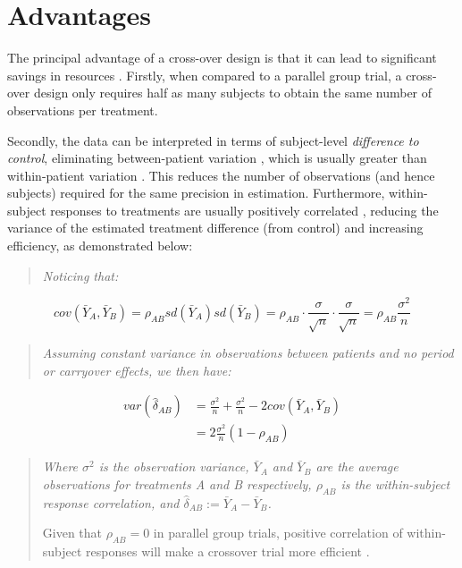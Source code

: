 \documentclass[12pt, TexShade, letterpaper]{report}
\begin{document}
\section{Advantages}
The principal advantage of a cross-over design is that it can lead to significant savings in resources \cite{senn2002crossover}. Firstly, when compared to a parallel group trial, a cross-over design only requires half as many subjects to obtain the same number of observations per treatment.

Secondly, the data can be interpreted in terms of subject-level \textit{difference to control}, eliminating between-patient variation \cite{senn2002crossover}, which is usually greater than within-patient variation \cite{piantadosi2005clinical}. This reduces the number of observations (and hence subjects) required for the same precision in estimation. Furthermore, within-subject responses to treatments are usually positively correlated \cite{piantadosi2005clinical}, reducing the variance of the estimated treatment difference (from control) and increasing efficiency, as demonstrated below:

\begin{quote}
    \textit{Noticing that:}
\end{quote}
\begin{equation*}
    cov(\bar{Y}_A, \bar{Y}_B)
= \rho_{AB}sd(\bar{Y}_A)sd(\bar{Y}_B) = \rho_{AB} \cdot \frac{\sigma}{\sqrt{n}} \cdot \frac{\sigma}{\sqrt{n}} = \rho_{AB}\frac{\sigma^2}{n}
\end{equation*}
\begin{quote}
    \textit{Assuming constant variance in observations between patients and no period or carryover effects, we then have:}
\end{quote}
\begin{align*}
    var(\hat{\delta}_{AB}) &=
    \frac{\sigma^2}{n} + \frac{\sigma^2}{n} - 2cov(\bar{Y}_A, \bar{Y}_B) \\
    &= 2\frac{\sigma^2}{n}(1-\rho_{AB})
\end{align*}
\begin{quote}
    \textit{Where $\sigma^2$ is the observation variance, $\bar{Y}_A$ and $\bar{Y}_B$ are the average observations for treatments A and B respectively, $\rho_{AB}$ is the within-subject response correlation, and $\hat{\delta}_{AB} := \bar{Y}_A - \bar{Y}_B$.}

    Given that $\rho_{AB} = 0$ in parallel group trials, positive correlation of within-subject responses will make a crossover trial more efficient \cite{piantadosi2005clinical}.
\end{quote}
\end{document}
